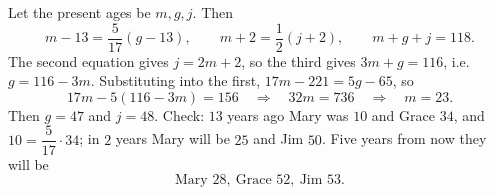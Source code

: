 Let the present ages be $m,g,j$. Then
\[
m-13=\dfrac{5}{17}(g-13),\qquad m+2=\dfrac{1}{2}(j+2),\qquad m+g+j=118 .
\]
The second equation gives $j=2m+2$, so the third gives $3m+g=116$, i.e. $g=116-3m$. Substituting into the first, $17m-221=5g-65$, so
\[
17m-5(116-3m)=156\quad\Longrightarrow\quad 32m=736\quad\Longrightarrow\quad m=23 .
\]
Then $g=47$ and $j=48$. Check: $13$ years ago Mary was $10$ and Grace $34$, and $10=\dfrac{5}{17}\cdot34$; in $2$ years Mary will be $25$ and Jim $50$. Five years from now they will be
\[
\boxed{\text{Mary }28,\ \text{Grace }52,\ \text{Jim }53}.
\]
